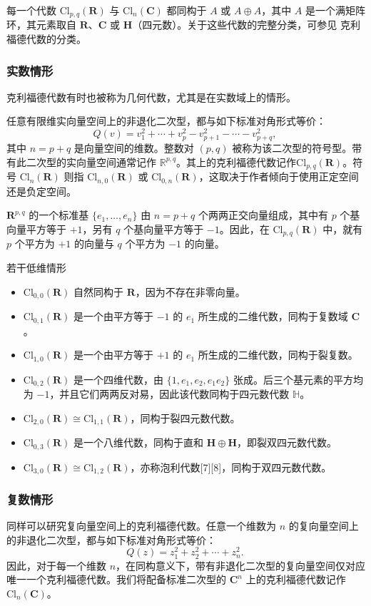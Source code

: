 每一个代数 $\mathrm{Cl}_{p,q}(\mathbf{R})$ 与 $\mathrm{Cl}_{n}(\mathbf{C})$ 都同构于 $A$ 或 $A \oplus A$，其中 $A$ 是一个满矩阵环，其元素取自 $\mathbf{R}$、$\mathbf{C}$ 或 $\mathbf{H}$（四元数）。关于这些代数的完整分类，可参见 克利福德代数的分类。
\subsubsection{实数情形}
克利福德代数有时也被称为几何代数，尤其是在实数域上的情形。

任意有限维实向量空间上的非退化二次型，都与如下标准对角形式等价：
$$
Q(v) = v_1^2 + \cdots + v_p^2 - v_{p+1}^2 - \cdots - v_{p+q}^2,~
$$
其中 $n = p + q$ 是向量空间的维数。整数对 $(p, q)$ 被称为该二次型的符号型。带有此二次型的实向量空间通常记作 $\mathbb{R}^{p,q}$。其上的克利福德代数记作$\mathrm{Cl}_{p,q}(\mathbf{R})$。符号 $\mathrm{Cl}_n(\mathbf{R})$ 则指 $\mathrm{Cl}_{n,0}(\mathbf{R})$ 或 $\mathrm{Cl}_{0,n}(\mathbf{R})$，这取决于作者倾向于使用正定空间还是负定空间。

$\mathbf{R}^{p,q}$ 的一个标准基 $\{e_1, \ldots, e_n\}$ 由 $n = p+q$ 个两两正交向量组成，其中有 $p$ 个基向量平方等于 $+1$，另有 $q$ 个基向量平方等于 $-1$。因此，在 $\mathrm{Cl}_{p,q}(\mathbf{R})$ 中，就有 $p$ 个平方为 $+1$ 的向量与 $q$ 个平方为 $-1$ 的向量。

若干低维情形
\begin{itemize}
\item $\mathrm{Cl}_{0,0}(\mathbf{R})$ 自然同构于 $\mathbf{R}$，因为不存在非零向量。
\item $\mathrm{Cl}_{0,1}(\mathbf{R})$ 是一个由平方等于 $-1$ 的 $e_1$ 所生成的二维代数，同构于复数域 $\mathbf{C}$。
\item $\mathrm{Cl}_{1,0}(\mathbf{R})$ 是一个由平方等于 $+1$ 的 $e_1$ 所生成的二维代数，同构于裂复数。
\item $\mathrm{Cl}_{0,2}(\mathbf{R})$ 是一个四维代数，由 $\{1, e_1, e_2, e_1 e_2\}$ 张成。后三个基元素的平方均为 $-1$，并且它们两两反对易，因此该代数同构于四元数代数 $\mathbb{H}$。
\item $\mathrm{Cl}_{2,0}(\mathbf{R}) \cong \mathrm{Cl}_{1,1}(\mathbf{R})$，同构于裂四元数代数。
\item $\mathrm{Cl}_{0,3}(\mathbf{R})$ 是一个八维代数，同构于直和 $\mathbf{H} \oplus \mathbf{H}$，即裂双四元数代数。
\item $\mathrm{Cl}_{3,0}(\mathbf{R}) \cong \mathrm{Cl}_{1,2}(\mathbf{R})$，亦称泡利代数[7][8]，同构于双四元数代数。
\end{itemize}
\subsubsection{复数情形}
同样可以研究复向量空间上的克利福德代数。任意一个维数为 $n$ 的复向量空间上的非退化二次型，都与如下标准对角形式等价：
$$
Q(z) = z_1^2 + z_2^2 + \cdots + z_n^2.~
$$
因此，对于每一个维数 $n$，在同构意义下，带有非退化二次型的复向量空间仅对应唯一一个克利福德代数。我们将配备标准二次型的 $\mathbf{C}^n$ 上的克利福德代数记作 $\mathrm{Cl}_n(\mathbf{C})$。

